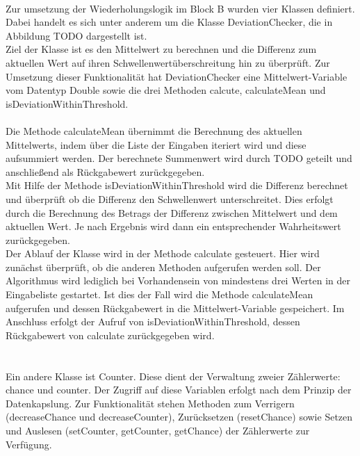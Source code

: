 \documentclass{article}
\begin{document}
    \\ 
    Zur umsetzung der Wiederholungslogik im Block B wurden vier Klassen definiert.
    Dabei handelt es sich unter anderem um die Klasse DeviationChecker, die in Abbildung TODO dargestellt ist.\\
    Ziel der Klasse ist es den Mittelwert zu berechnen und die Differenz zum aktuellen Wert auf ihren Schwellenwertüberschreitung hin zu überprüft.
    Zur Umsetzung dieser Funktionalität hat DeviationChecker eine Mittelwert-Variable vom Datentyp Double sowie die drei Methoden calcute, calculateMean und isDeviationWithinThreshold.\\
    \\
    Die Methode calculateMean übernimmt die Berechnung des aktuellen Mittelwerts, indem über die Liste der Eingaben iteriert wird und diese aufsummiert werden.
    Der berechnete Summenwert wird durch TODO geteilt und anschließend als Rückgabewert zurückgegeben.\\
    Mit Hilfe der Methode isDeviationWithinThreshold wird die Differenz berechnet und überprüft ob die Differenz den Schwellenwert unterschreitet.
    Dies erfolgt durch die Berechnung des Betrags der Differenz zwischen Mittelwert und dem aktuellen Wert.
    Je nach Ergebnis wird dann ein entsprechender Wahrheitswert zurückgegeben.\\
    Der Ablauf der Klasse wird in der Methode calculate gesteuert. Hier wird zunächst überprüft, ob die anderen Methoden aufgerufen werden soll.
    Der Algorithmus wird lediglich bei Vorhandensein von mindestens drei Werten in der Eingabeliste gestartet.
    Ist dies der Fall wird die Methode calculateMean aufgerufen und dessen Rückgabewert in die Mittelwert-Variable gespeichert.
    Im Anschluss erfolgt der Aufruf von isDeviationWithinThreshold, dessen Rückgabewert von calculate zurückgegeben wird.\\
    \\
    \\
    Ein andere Klasse ist Counter.
    Diese dient der Verwaltung zweier Zählerwerte: chance und counter.
    Der Zugriff auf diese Variablen erfolgt nach dem Prinzip der Datenkapslung.
    Zur Funktionalität stehen Methoden zum Verrigern (decreaseChance und decreaseCounter), Zurücksetzen (resetChance) sowie Setzen und Auslesen (setCounter, getCounter, getChance) der Zählerwerte zur Verfügung.\\
\end{document}
